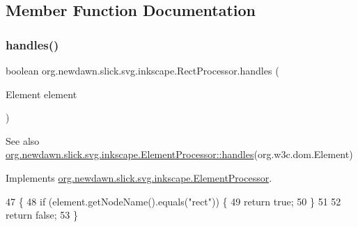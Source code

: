\subsection{Member Function Documentation}
\mbox{\label{classorg_1_1newdawn_1_1slick_1_1svg_1_1inkscape_1_1_rect_processor_a8558ba7a28daef670cedb8afe8d68286}} 
\subsubsection{\texorpdfstring{handles()}{handles()}}
{\footnotesize\ttfamily boolean org.\+newdawn.\+slick.\+svg.\+inkscape.\+Rect\+Processor.\+handles (\begin{DoxyParamCaption}\item[{Element}]{element }\end{DoxyParamCaption})\hspace{0.3cm}{\ttfamily [inline]}}

\begin{DoxySeeAlso}{See also}
\mbox{\hyperlink{interfaceorg_1_1newdawn_1_1slick_1_1svg_1_1inkscape_1_1_element_processor_ae95bbf21a67c52aff02cf09259c554a3}{org.\+newdawn.\+slick.\+svg.\+inkscape.\+Element\+Processor\+::handles}}(org.\+w3c.\+dom.\+Element) 
\end{DoxySeeAlso}


Implements \mbox{\hyperlink{interfaceorg_1_1newdawn_1_1slick_1_1svg_1_1inkscape_1_1_element_processor_ae95bbf21a67c52aff02cf09259c554a3}{org.\+newdawn.\+slick.\+svg.\+inkscape.\+Element\+Processor}}.


\begin{DoxyCode}
47                                             \{
48         \textcolor{keywordflow}{if} (element.getNodeName().equals(\textcolor{stringliteral}{"rect"})) \{
49             \textcolor{keywordflow}{return} \textcolor{keyword}{true};
50         \}
51         
52         \textcolor{keywordflow}{return} \textcolor{keyword}{false};
53     \}
\end{DoxyCode}
\mbox{\label{classorg_1_1newdawn_1_1slick_1_1svg_1_1inkscape_1_1_rect_processor_ab411c9f69524536d7b05ab0e7ea3e69e}} 
